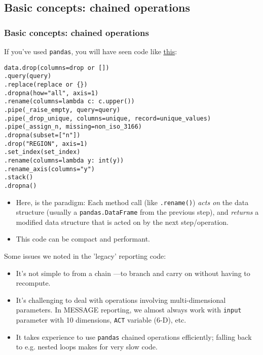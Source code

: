 \documentclass[12pt,aspectratio=169]{beamer}
\renewcommand{\mod}[1]{\texttt{#1}}
\newcommand{\py}[1]{\texttt{#1}}
\begin{document}
\subsection{Basic concepts: chained operations}

\begin{frame}
\frametitle{Basic concepts: chained operations}
If you've used \mod{pandas},
you will have seen code like \href{https://github.com/iiasa/message-ix-models/blob/7a999bc0c636f0afea73f89f12e5cfe593d6d23c/message_ix_models/tools/iamc.py#L240-L254}
{this}:

\begin{verbatim}
data.drop(columns=drop or [])
.query(query)
.replace(replace or {})
.dropna(how="all", axis=1)
.rename(columns=lambda c: c.upper())
.pipe(_raise_empty, query=query)
.pipe(_drop_unique, columns=unique, record=unique_values)
.pipe(_assign_n, missing=non_iso_3166)
.dropna(subset=["n"])
.drop("REGION", axis=1)
.set_index(set_index)
.rename(columns=lambda y: int(y))
.rename_axis(columns="y")
.stack()
.dropna()
\end{verbatim}

\begin{itemize}
  \item Here,  is the paradigm:
    Each method call (like \py{.rename()}) \emph{acts on} the data structure (usually a \py{pandas.DataFrame} from the previous step), and \emph{returns} a modified data structure that is acted on by the next step/operation.
  \item This code can be compact and performant.
\end{itemize}

Some issues we noted in the 'legacy' reporting code:
\begin{itemize}
  \item It's not simple to  from a chain
    —to branch and carry on without having to recompute.
  \item It's challenging to deal with operations involving multi-dimensional parameters.
    In MESSAGE reporting, we almost always work with
    \texttt{input} parameter with 10 dimensions,
    \texttt{ACT} variable (6-D), etc.
  \item It takes experience to use \mod{pandas} chained operations efficiently;
    falling back to e.g. nested loops makes for very slow code.
\end{itemize}
\end{frame}
\end{document}
